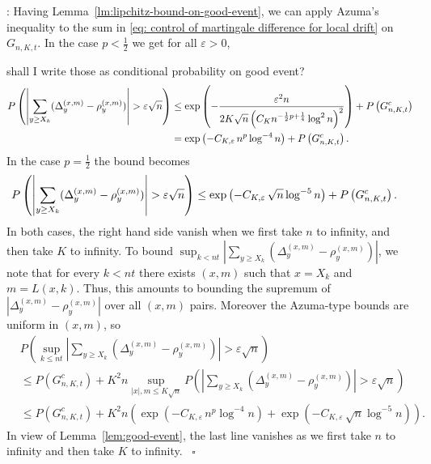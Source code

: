 \documentclass[twoside,12pt,a4paper]{article}
\numberwithin{equation}{section}
\newenvironment{proof}[1][Proof]{{\sc #1}:}{~\hfill $\square$}
\begin{document}
\begin{proof}[Proof of Proposition~\ref{lm: approx local drift by conditional means}]
Having Lemma~\ref{lm:lipchitz-bound-on-good-event}, we can apply Azuma's inequality to the sum in \eqref{eq: control of martingale difference for local drift} on $G_{n, K, t}$. In the case $p < \frac{1}{2}$ we get for all $\varepsilon>0$,

{\color{red} shall I write those as conditional probability on good event?}
\begin{align}
	P\left( \left| \sum_{y\ge X_k} (\Delta_y^{(x,m)} - \rho_y^{(x,m)})  \right| > \varepsilon \sqrt{n}  \right) \notag
	&\le \exp\left( - \frac{\varepsilon^2 n}{2 K \sqrt{n} \left( C_{K} n^{-\frac{1}{2}p + \frac{1}{4}} \log^2 n  \right)^2 } \right) + P\left(  G_{n, K, t}^c   \right) \notag \\
	&= \exp\left( - C_{K, \varepsilon} \, n^{p } \log^{-4} n \right) +
	P\left(  G_{n, K, t}^c   \right) 
   \label{eqn:azuma-drift-martingale}
.\end{align}
In the case $p = \frac{1}{2}$ the bound becomes
\begin{align}
	P\left( \left| \sum_{y \ge X_k} (\Delta_y^{(x,m)} - \rho_y^{(x,m)}) \right|  > \varepsilon \sqrt{n}  \right) \notag
	&\le  \exp\left( - C_{K, \varepsilon} \, \sqrt{n}  \log^{-5} n \right) + 
	P\left(  G_{n, K, t}^c   \right) 
.\end{align}
In both cases, the right hand side vanish when we first take $n $ to infinity, and then take $K$ to infinity. To bound $\sup_{k < nt} \left| \sum_{y \ge X_k} (\Delta_y^{(x,m)} - \rho_y^{(x,m)}) \right|$, we note that for every $k < nt$ there exists $(x,m)$ such that $x = X_k$ and $m = L(x,k)$. Thus, this amounts to bounding the supremum of $\left| \Delta_y^{(x,m)} - \rho_y^{(x,m)} \right| $ over all $(x,m)$ pairs. Moreover the Azuma-type bounds are uniform in $(x,m)$, so 
\begin{align*}
	& P\left( \sup _{k \le nt} \left| \sum_{y \ge X_k} \left(\Delta_y^{(x,m)} - \rho_y^{(x,m)}\right) \right|  > \varepsilon \sqrt{n}  \right) \\
	&\le P(G_{n, K, t}^c) + K^2 n \sup _{|x|, m \le  K \sqrt{n} }
	P\left( \left| \sum_{y \ge X_k} (\Delta_y^{(x,m)} - \rho_y^{(x,m)}) \right|  > \varepsilon \sqrt{n} \right) \\
	&\le P(G_{n, K, t}^c) + K^2 n \left( \exp\left( - C_{K, \varepsilon} \, n^{p } \log^{-4} n \right) + \exp\left( - C_{K, \varepsilon} \, \sqrt{n}  \log^{-5} n \right) \right) 
.\end{align*}
In view of Lemma~\ref{lem:good-event}, the last line vanishes as we first take $n$ to infinity and then take $K$ to infinity.
\end{proof}
\end{document}

